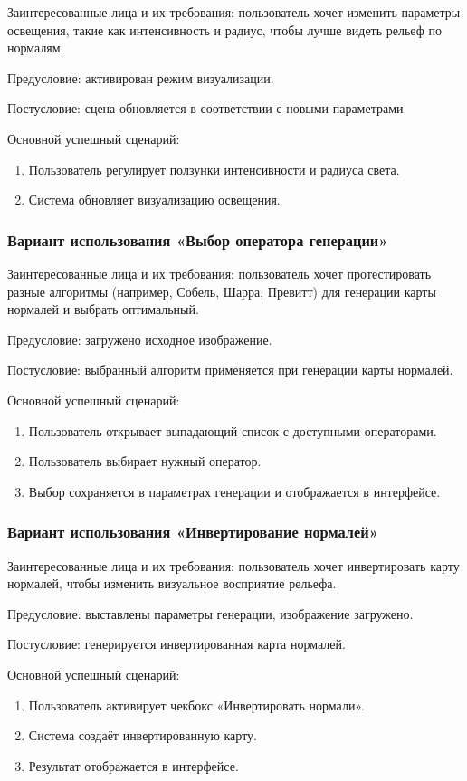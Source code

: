 Заинтересованные лица и их требования: пользователь хочет изменить параметры освещения, такие как интенсивность и радиус, чтобы лучше видеть рельеф по нормалям.

Предусловие: активирован режим визуализации.

Постусловие: сцена обновляется в соответствии с новыми параметрами.

Основной успешный сценарий:
\begin{enumerate}
	\item Пользователь регулирует ползунки интенсивности и радиуса света.
	\item Система обновляет визуализацию освещения.
\end{enumerate}
\subsubsection{Вариант использования «Выбор оператора генерации»}

Заинтересованные лица и их требования: пользователь хочет протестировать разные алгоритмы (например, Собель, Шарра, Превитт) для генерации карты нормалей и выбрать оптимальный.

Предусловие: загружено исходное изображение.

Постусловие: выбранный алгоритм применяется при генерации карты нормалей.

Основной успешный сценарий:
\begin{enumerate}
	\item Пользователь открывает выпадающий список с доступными операторами.
	\item Пользователь выбирает нужный оператор.
	\item Выбор сохраняется в параметрах генерации и отображается в интерфейсе.
\end{enumerate}
\subsubsection{Вариант использования «Инвертирование нормалей»}

Заинтересованные лица и их требования: пользователь хочет инвертировать карту нормалей, чтобы изменить визуальное восприятие рельефа.

Предусловие: выставлены параметры генерации, изображение загружено.

Постусловие: генерируется инвертированная карта нормалей.

Основной успешный сценарий:
\begin{enumerate}
	\item Пользователь активирует чекбокс «Инвертировать нормали».
	\item Система создаёт инвертированную карту.
	\item Результат отображается в интерфейсе.
\end{enumerate}
